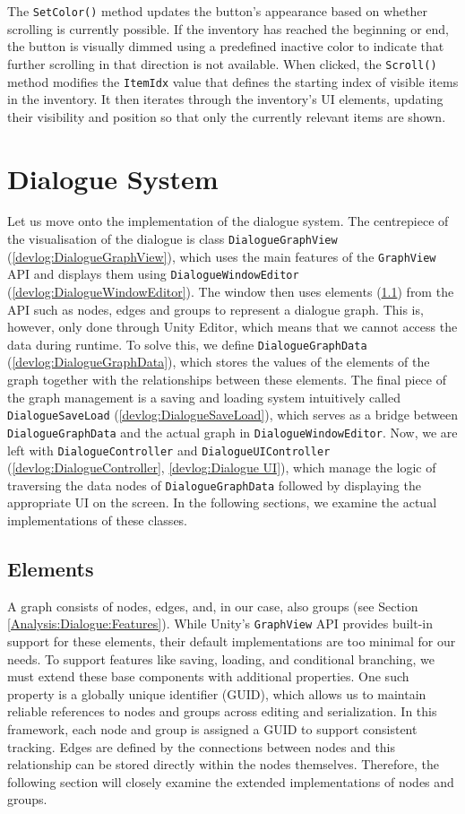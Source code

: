 The \verb|SetColor()| method updates the button’s appearance based on whether scrolling is currently possible. If the inventory has reached the beginning or end, the button is visually dimmed using a predefined inactive color to indicate that further scrolling in that direction is not available. When clicked, the \verb|Scroll()| method modifies the \verb|ItemIdx| value that defines the starting index of visible items in the inventory. It then iterates through the inventory’s UI elements, updating their visibility and position so that only the currently relevant items are shown.


\section{Dialogue System}
\label{DialogueSystem}
Let us move onto the implementation of the dialogue system. The centrepiece of the visualisation of the dialogue is class \verb|DialogueGraphView| (\ref{devlog:DialogueGraphView}), which uses the main features of the \verb|GraphView| API and displays them using \verb|DialogueWindowEditor| (\ref{devlog:DialogueWindowEditor}). The window then uses elements (\ref{devlog:Elements}) from the API such as nodes, edges and groups to represent a dialogue graph. This is, however, only done through Unity Editor, which means that we cannot access the data during runtime. To solve this, we define \verb|DialogueGraphData| (\ref{devlog:DialogueGraphData}), which stores the values of the elements of the graph together with the relationships between these elements. The final piece of the graph management is a saving and loading system intuitively called \verb|DialogueSaveLoad| (\ref{devlog:DialogueSaveLoad}), which serves as a bridge between \verb|DialogueGraphData| and the actual graph in \verb|DialogueWindowEditor|. Now, we are left with \verb|DialogueController| and \verb|DialogueUIController| (\ref{devlog:DialogueController}, \ref{devlog:Dialogue UI}), which manage the logic of traversing the data nodes of \verb|DialogueGraphData| followed by displaying the appropriate UI on the screen. In the following sections, we examine the actual implementations of these classes.

\subsection{Elements}
\label{devlog:Elements}
A graph consists of nodes, edges, and, in our case, also groups (see Section \ref{Analysis:Dialogue:Features}). While Unity’s \verb|GraphView| API provides built-in support for these elements, their default implementations are too minimal for our needs. To support features like saving, loading, and conditional branching, we must extend these base components with additional properties. One such property is a globally unique identifier (GUID), which allows us to maintain reliable references to nodes and groups across editing and serialization. In this framework, each node and group is assigned a GUID to support consistent tracking. Edges are defined by the connections between nodes and this relationship can be stored directly within the nodes themselves. Therefore, the following section will closely examine the extended implementations of nodes and groups.


